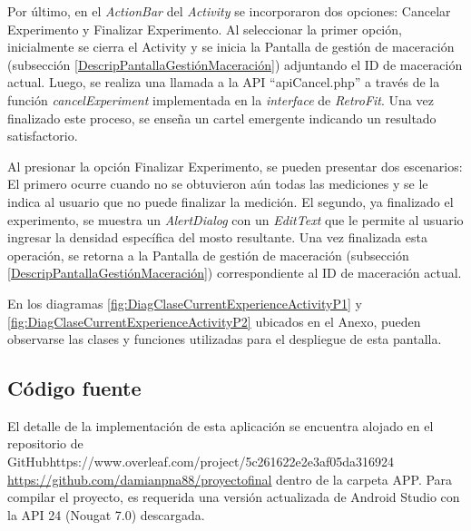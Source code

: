             \par Por último, en el \textit{ActionBar} del \textit{Activity} se incorporaron dos opciones: Cancelar Experimento y Finalizar Experimento. Al seleccionar la primer opción, inicialmente se cierra el Activity y se inicia la Pantalla de gestión de maceración (subsección \ref{DescripPantallaGestiónMaceración}) adjuntando el ID de maceración actual. Luego, se realiza una llamada a la API ``apiCancel.php'' a través de la función \textit{cancelExperiment} implementada en la \textit{interface} de \textit{RetroFit}. Una vez finalizado este proceso, se enseña un cartel emergente indicando un resultado satisfactorio.
            
            \par Al presionar la opción Finalizar Experimento, se pueden presentar dos escenarios: El primero ocurre cuando no se obtuvieron aún todas las mediciones y se le indica al usuario que no puede finalizar la medición. El segundo, ya finalizado el experimento, se muestra un \textit{AlertDialog} con un \textit{EditText} que le permite al usuario ingresar la densidad específica del mosto resultante. Una vez finalizada esta operación, se retorna a la Pantalla de gestión de maceración (subsección \ref{DescripPantallaGestiónMaceración}) correspondiente al ID de maceración actual.
            
            \par En los diagramas \ref{fig:DiagClaseCurrentExperienceActivityP1} y \ref{fig:DiagClaseCurrentExperienceActivityP2} ubicados en el Anexo, pueden observarse las clases y funciones utilizadas para el despliegue de esta pantalla.
            
    \subsection{Código fuente}
    \par El detalle de la implementación de esta aplicación se encuentra alojado en el repositorio de GitHubhttps://www.overleaf.com/project/5c261622e2e3af05da316924 \url{https://github.com/damianpna88/proyectofinal} dentro de la carpeta APP. Para compilar el proyecto, es requerida una versión actualizada de Android Studio con la API 24 (Nougat 7.0) descargada.